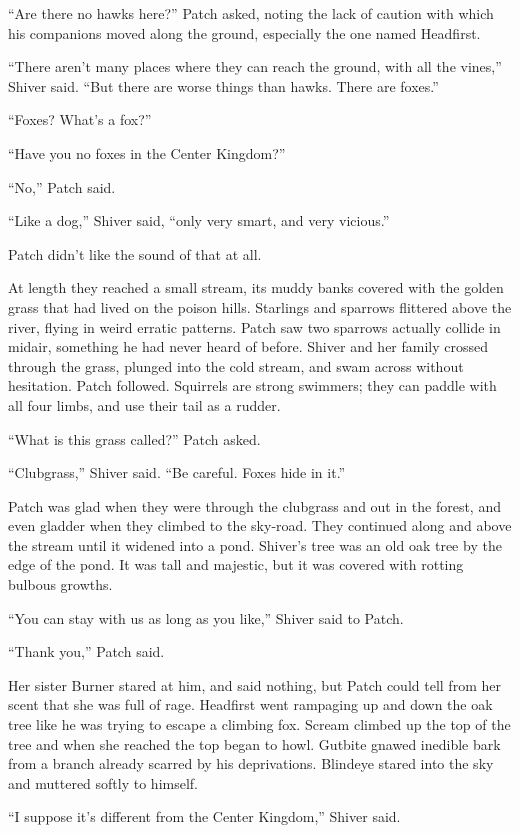 \documentclass[ebook,oneside,openany,17pt]{memoir}
\begin{document}
“Are there no hawks here?” Patch asked, noting the lack of caution
with which his companions moved along the ground, especially the one
named Headfirst.

“There aren’t many places where they can reach the ground, with all
the vines,” Shiver said. “But there are worse things than hawks. There
are foxes.”

“Foxes? What’s a fox?”

“Have you no foxes in the Center Kingdom?”

“No,” Patch said.

“Like a dog,” Shiver said, “only very smart, and very vicious.”

Patch didn’t like the sound of that at all.

At length they reached a small stream, its muddy banks covered with
the golden grass that had lived on the poison hills. Starlings and
sparrows flittered above the river, flying in weird erratic
patterns. Patch saw two sparrows actually collide in midair, something
he had never heard of before. Shiver and her family crossed through
the grass, plunged into the cold stream, and swam across without
hesitation. Patch followed. Squirrels are strong swimmers; they can
paddle with all four limbs, and use their tail as a rudder.

“What is this grass called?” Patch asked.

“Clubgrass,” Shiver said. “Be careful. Foxes hide in it.”

Patch was glad when they were through the clubgrass and out in the
forest, and even gladder when they climbed to the sky-road. They
continued along and above the stream until it widened into a
pond. Shiver’s tree was an old oak tree by the edge of the pond. It
was tall and majestic, but it was covered with rotting bulbous
growths.

“You can stay with us as long as you like,” Shiver said to Patch.

“Thank you,” Patch said.

Her sister Burner stared at him, and said nothing, but Patch could
tell from her scent that she was full of rage. Headfirst went
rampaging up and down the oak tree like he was trying to escape a
climbing fox. Scream climbed up the top of the tree and when she
reached the top began to howl. Gutbite gnawed inedible bark from a
branch already scarred by his deprivations. Blindeye stared into the
sky and muttered softly to himself.

“I suppose it’s different from the Center Kingdom,” Shiver said.
\end{document}
